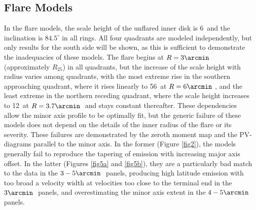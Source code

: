 \documentclass[useAMS,usenatbib]{mn2e}
\begin{document}
\subsection{Flare Models} \label{U2082f} In the flare models, the scale height of the unflared inner disk is
6\arcsec\ and the inclination is $84.5^{\circ}$ in all rings.  All four
quadrants are modeled independently, but only results for the south
side will be shown, as this is sufficient to demonstrate the
inadequacies of these models.  The flare begins at $R=3\arcmin\ $ (approximately 
$R_{25}$) in all
quadrants, but the increase of the scale height with radius varies
among quadrants, with the most extreme rise in the southern
approaching quadrant, where it rises linearly to 56\arcsec\ at $R=6\arcmin\ $, and
the least extreme in the northern receding quadrant, where the scale
height increases to 12\arcsec\ at $R=3.7\arcmin\ $ and stays constant thereafter.
These dependencies allow the minor axis profile to be optimally fit, but
the generic failure of these models does not depend on the details of
the inner radius of the flare or its severity.  These failures are
demonstrated by the zeroth moment map and the PV-diagrams parallel to the minor axis.  In the
former (Figure \ref{fig2}), the models generally fail to reproduce the tapering of
emission with increasing major axis offset.  In the latter (Figures \ref{fig5a} and
\ref{fig5b}), they are a
particularly bad match to the data in the $3-5\arcmin\ $ panels, producing
high latitude emission with too broad a velocity width at velocities
too close to the terminal end in the $3\arcmin\ $ panels, and overestimating
the minor axis extent in the $4-5\arcmin\ $ panels.\\
\end{document}
